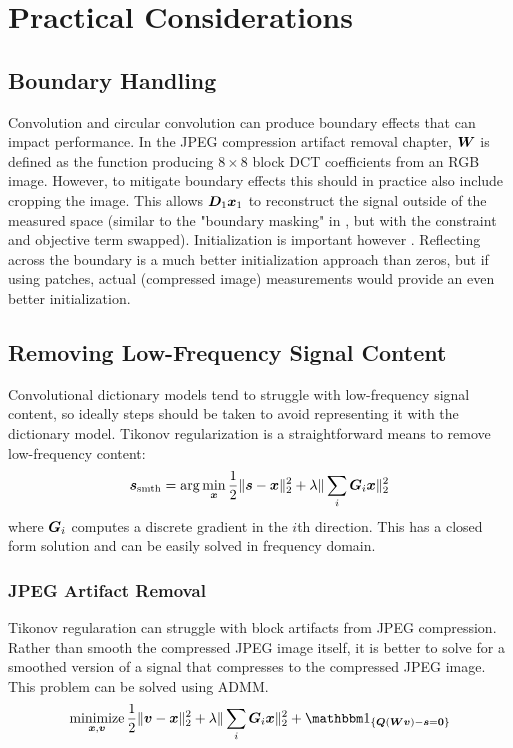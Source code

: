 \chapter{Practical Considerations}
\section{Boundary Handling}
Convolution and circular convolution can produce boundary effects that can impact performance. In the JPEG compression artifact removal chapter, $\bm{W}$ is defined as the function producing $8 \times 8$ block DCT coefficients from an RGB image. However, to mitigate boundary effects this should in practice also include cropping the image. This allows $\bm{D}_1\bm{x}_1$ to reconstruct the signal outside of the measured space (similar to the "boundary masking" in \cite{wohlberg2016boundary}, but with the constraint and objective term swapped). Initialization is important however \cite{DBLP:journals/corr/WohlbergR17}. Reflecting across the boundary is a much better initialization approach than zeros, but if using patches, actual (compressed image) measurements would provide an even better initialization. 
\section{Removing Low-Frequency Signal Content}
Convolutional dictionary models tend to struggle with low-frequency signal content, so ideally steps should be taken to avoid representing it with the dictionary model. Tikonov regularization is a straightforward means to remove low-frequency content:
\begin{equation}
\bm{s}_{\text{smth}} = \arg\min_{\bm{x}} \frac{1}{2}\|\bm{s} - \bm{x}\|_2^2 + \lambda\|\sum_i \bm{G}_i\bm{x}\|_2^2
\end{equation}
where $\bm{G}_i$ computes a discrete gradient in the $i$th direction. This has a closed form solution and can be easily solved in frequency domain.
\subsection{JPEG Artifact Removal}
Tikonov regularation can struggle with block artifacts from JPEG compression. Rather than smooth the compressed JPEG image itself, it is better to solve for a smoothed version of a signal that compresses to the compressed JPEG image. This problem can be solved using ADMM.
\begin{equation}
\minimize_{\vx,\vv} \frac{1}{2}\|\vv - \vx\|_2^2 + \lambda\|\sum_i \mG_i\vx\|_2^2 + \indicator_{\{\mQ(\mW\vv) - \vs = \vzero\}}
\end{equation}

